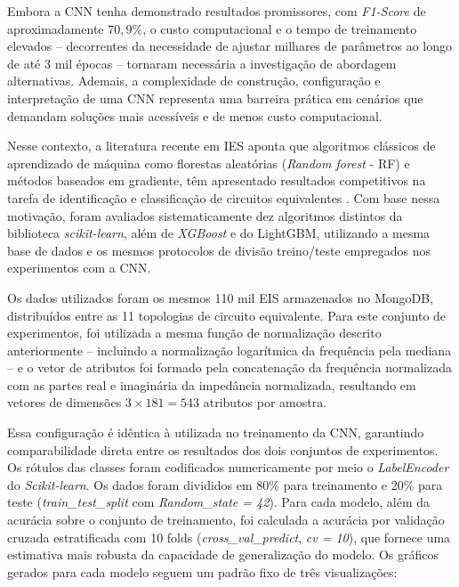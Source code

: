 Embora a CNN tenha demonstrado resultados promissores, com \textit{F1-Score} de aproximadamente
$70,9\%$, o custo computacional e o tempo de treinamento elevados – decorrentes da necessidade
de ajustar milhares de parâmetros ao longo de até 3 mil épocas – tornaram necessária a
investigação de abordagem alternativas. Ademais, a complexidade de construção, configuração
e interpretação de uma CNN representa uma barreira prática em cenários que demandam soluções mais acessíveis e de menos custo computacional. 

Nesse contexto, a literatura recente
em IES aponta que algoritmos clássicos de aprendizado de máquina como florestas aleatórias
(\textit{Random forest} - RF) e métodos baseados em gradiente, têm apresentado resultados
competitivos na tarefa de identificação e classificação de circuitos equivalentes \cite{schaeffer2023machine}. Com base
nessa motivação, foram avaliados sistematicamente dez algoritmos distintos da biblioteca
\textit{scikit-learn}, além de \textit{XGBoost} e do LightGBM, utilizando a mesma base de dados e os mesmos
protocolos de divisão treino/teste empregados nos experimentos com a CNN.

Os dados utilizados foram os mesmos 110 mil EIS armazenados no MongoDB, distribuídos
entre as 11 topologias de circuito equivalente. Para este conjunto de experimentos, foi utilizada
a mesma função de normalização descrito anteriormente -- incluindo a normalização logarítmica
da frequência pela mediana -- e o vetor de atributos foi formado pela concatenação da frequência
normalizada com as partes real e imaginária da impedância normalizada, resultando em vetores
de dimensões $3 \times 181 = 543$ atributos por amostra.

Essa configuração é idêntica à utilizada
no treinamento da CNN, garantindo comparabilidade direta entre os resultados dos dois
conjuntos de experimentos. Os rótulos das classes foram codificados numericamente por meio
o \textit{LabelEncoder} do \textit{Scikit-learn}. Os dados foram divididos em 80\% para treinamento e 20\%
para teste (\textit{train\_test\_split} com \textit{Random\_state = 42}). Para cada modelo, além da acurácia sobre
o conjunto de treinamento, foi calculada a acurácia por validação cruzada estratificada com 10
folds (\textit{cross\_val\_predict}, \textit{cv = 10}), que fornece uma estimativa mais robusta da capacidade de
generalização do modelo. Os gráficos gerados para cada modelo seguem um padrão fixo de três
visualizações:

